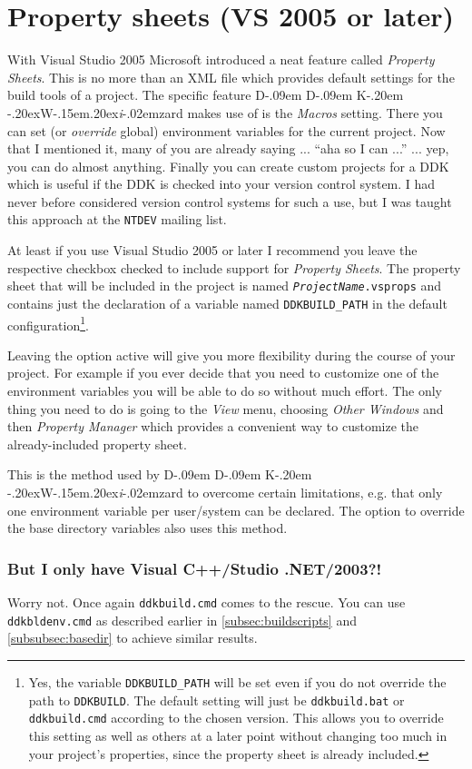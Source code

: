 \documentclass[a4paper,titlepage]{report}
\def\ddkwiz{\texorpdfstring{D\kern-.09em D\kern-.09em K\kern-.20em \raise-.20ex\hbox{W}\kern-.15em\raise.20ex\hbox{\it{i}}\kern-.02em{zard}}{DDKWizard}}
\begin{document}
\section{Property sheets (VS 2005 or later)}
\label{sec:propsheets}
With Visual Studio 2005 Microsoft introduced a neat feature called \emph{Property Sheets}.
This is no more than an XML file which provides default settings for the build tools
of a project. The specific feature \ddkwiz{} makes use of is the \emph{Macros}
setting. There you can set (or \emph{override} global) environment variables for the
current project. Now that I mentioned it, many of you are already saying ... ``aha
so I can ...'' ... yep, you can do almost anything. Finally you can create custom
projects for a DDK which is useful if the DDK is checked into your version control
system. I had never before considered version control systems for such a use, but
I was taught this approach at the \texttt{NTDEV} mailing list.

At least if you use Visual Studio 2005 or later I recommend you leave the respective checkbox
checked to include support for \emph{Property Sheets}. The property sheet that will
be included in the project is named \texttt{\emph{ProjectName}.vsprops} and contains
just the declaration of a variable named \texttt{DDKBUILD\_PATH} in the default
configuration\footnote{Yes, the variable \texttt{DDKBUILD\_PATH} will be set even
if you do not override the path to \texttt{DDKBUILD}. The default setting will
just be \texttt{ddkbuild.bat} or \texttt{ddkbuild.cmd} according to the chosen
version. This allows you to override this setting as well as others at a later
point without changing too much in your project's properties, since the property
sheet is already included.}.

Leaving the option active will give you more
flexibility during the course of your project. For example if you ever decide
that you need to customize one of the environment variables you will be able
to do so without much effort. The only thing you need to do is going to the
\emph{View} menu, choosing \emph{Other Windows} and then \emph{Property Manager}
which provides a convenient way to customize the already-included property sheet.

This is the method used by \ddkwiz{} to overcome certain limitations, e.g.
that only one environment variable per user/system can be declared. The option
to override the base directory variables also uses this method.

\subsubsection{But I only have Visual C++/Studio .NET/2003?!}
Worry not. Once again \texttt{ddkbuild.cmd} comes to the rescue. You can use \texttt{ddkbldenv.cmd}
as described earlier in \autoref{subsec:buildscripts} and \autoref{subsubsec:basedir} to achieve
similar results.
\end{document}
